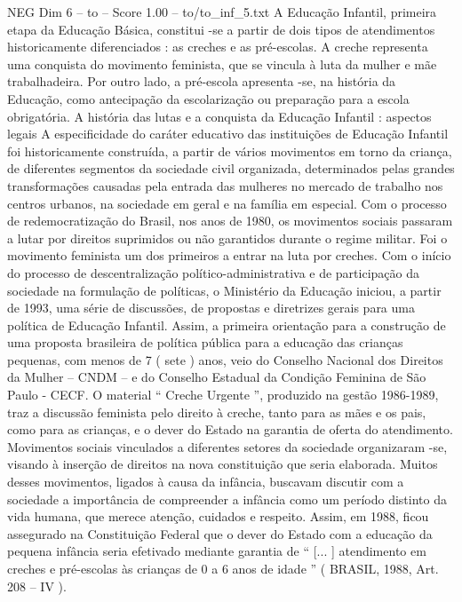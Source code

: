 \begin{textsample}{NEG Dim 6 – to – Score 1.00 – to/to\_inf\_5.txt}  \label{ex:f6_neg_111}
A Educação Infantil, primeira etapa da Educação Básica, constitui -se a partir de dois tipos de atendimentos historicamente diferenciados : as creches e as pré-escolas.
A creche representa uma conquista do movimento feminista, que se vincula à luta da mulher e mãe trabalhadeira.
Por outro lado, a pré-escola apresenta -se, na história da Educação, como antecipação da escolarização ou preparação para a escola obrigatória.
A história das lutas e a conquista da Educação Infantil : aspectos legais A especificidade do caráter educativo das instituições de Educação Infantil foi historicamente construída, a partir de vários movimentos em torno da criança, de diferentes segmentos da sociedade civil organizada, determinados pelas grandes transformações causadas pela entrada das mulheres no mercado de trabalho nos centros urbanos, na sociedade em geral e na família em especial.
Com o processo de redemocratização do Brasil, nos anos de 1980, os movimentos sociais passaram a lutar por direitos suprimidos ou não garantidos durante o regime militar.
Foi o movimento feminista um dos primeiros a entrar na luta por creches.
Com o início do processo de descentralização político-administrativa e de participação da sociedade na formulação de políticas, o Ministério da Educação iniciou, a partir de 1993, uma série de discussões, de propostas e diretrizes gerais para uma política de Educação Infantil.
Assim, a primeira orientação para a construção de uma proposta brasileira de política pública para a educação das crianças pequenas, com menos de 7 ( sete ) anos, veio do Conselho Nacional dos Direitos da Mulher – CNDM – e do Conselho Estadual da Condição Feminina de São Paulo - CECF.
O material “ Creche Urgente ”, produzido na gestão 1986-1989, traz a discussão feminista pelo direito à creche, tanto para as mães e os pais, como para as crianças, e o dever do Estado na garantia de oferta do atendimento.
Movimentos sociais vinculados a diferentes setores da sociedade organizaram -se, visando à inserção de direitos na nova constituição que seria elaborada.
Muitos desses movimentos, ligados à causa da infância, buscavam discutir com a sociedade a importância de compreender a infância como um período distinto da vida humana, que merece atenção, cuidados e respeito.
Assim, em 1988, ficou assegurado na Constituição Federal que o dever do Estado com a educação da pequena infância seria efetivado mediante garantia de “ [... ] atendimento em creches e pré-escolas às crianças de 0 a 6 anos de idade ” ( BRASIL, 1988, Art. 208 – IV ).

\end{textsample}
